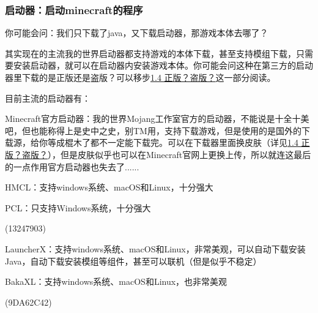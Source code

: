 \documentclass[UTF8,a4paper]{article}
\begin{document}
			\subsubsection{启动器：启动minecraft的程序}
				\hypertarget{1.3.2}{}
				\par 你可能会问：我们只下载了java，又下载启动器，那游戏本体去哪了？
				\par 其实现在的主流我的世界启动器都支持游戏的本体下载，甚至支持模组下载，只需要安装启动器，就可以在启动器内安装游戏本体。你可能会问这种在第三方的启动器里下载的是正版还是盗版？可以移步\hyperlink{1.4}{1.4 正版？盗版？}这一部分阅读。
				\par 目前主流的启动器有：
				\par Minecraft官方启动器：我的世界Mojang工作室官方的启动器，不能说是十全十美吧，但也能称得上是史中之史，别TM用，支持下载游戏，但是使用的是国外的下载源，给你等成棍木了都不一定能下载完。可以在下载器里面换皮肤（详见\hyperlink{1.4}{1.4 正版？盗版？}），但是皮肤似乎也可以在Minecraft官网上更换上传，所以就连这最后的一点作用官方启动器也失去了......
				\par HMCL：支持windows系统、macOS和Linux，十分强大
				\par PCL：只支持Windows系统，十分强大
				\begin{flushright}(13247903)\end{flushright}
				\par LauncherX：支持windows系统、macOS和Linux，非常美观，可以自动下载安装Java，自动下载安装模组等组件，甚至可以联机（但是似乎不稳定）
				\par BakaXL：支持windows系统、macOS和Linux，也非常美观
				\begin{flushright}(9DA62C42)\end{flushright}
\end{document}

